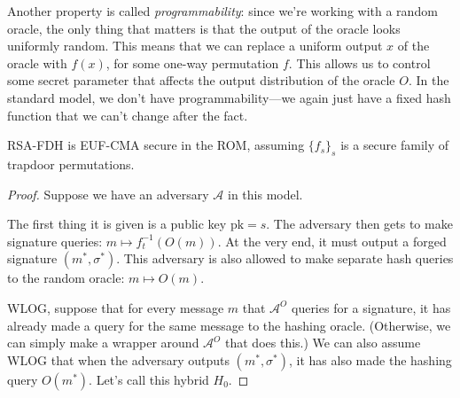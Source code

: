 Another property is called \emph{programmability}: since we're working with a random oracle, the only thing that matters is that the output of the oracle looks uniformly random. This means that we can replace a uniform output $x$ of the oracle with $f(x)$, for some one-way permutation $f$. This allows us to control some secret parameter that affects the output distribution of the oracle $O$. In the standard model, we don't have programmability---we again just have a fixed hash function that we can't change after the fact.

\begin{theorem}
    RSA-FDH is EUF-CMA secure in the ROM, assuming $\{f_s\}_s$ is a secure family of trapdoor permutations.
\end{theorem}

\begin{proof}
    Suppose we have an adversary $\mathcal{A}$ in this model.

    The first thing it is given is a public key $\mathrm{pk} = s$. The adversary then gets to make signature queries: $m \mapsto f_t^{-1}(O(m))$. At the very end, it must output a forged signature $(m^*, \sigma^*)$. This adversary is also allowed to make separate hash queries to the random oracle: $m \mapsto O(m)$. %

    \begin{center}
    \end{center}

    WLOG, suppose that for every message $m$ that $\mathcal{A}^O$ queries for a signature, it has already made a query for the same message to the hashing oracle. (Otherwise, we can simply make a wrapper around $\mathcal{A}^O$ that does this.) We can also assume WLOG that when the adversary outputs $(m^*, \sigma^*)$, it has also made the hashing query $O(m^*)$. Let's call this hybrid $H_0$.


\end{proof}
